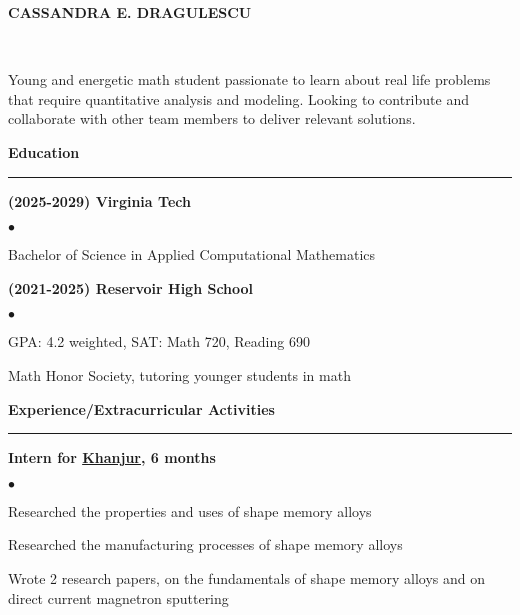 \documentclass[11pt]{article}
\begin{document}
\begin{center}
   \Large {\bf{CASSANDRA E. DRAGULESCU}}
\end{center}

\noindent
{}\\

\vspace*{8pt}
\noindent
Young and energetic math student passionate to learn about real life 
problems that require quantitative analysis and modeling.  Looking to
contribute and collaborate with other team members to deliver relevant 
solutions.

\vspace*{8pt}
\noindent
\large\textsf{\textbf {Education}}

\vspace*{-8pt}
\noindent
\rule{165mm}{0.25mm}
\normalfont\normalsize

\vspace*{4pt}
\noindent
{\bf (2025-2029) Virginia Tech} 
\begin{list}{$\bullet$}
   {\setlength{\itemsep}{0ex} \setlength{\parsep}{1ex}}

  \item Bachelor of Science in Applied Computational Mathematics
\end{list}


\noindent
{\bf (2021-2025) Reservoir High School} 
\begin{list}{$\bullet$}
   {\setlength{\itemsep}{0ex}
     \setlength{\parsep}{1ex}}
   
  \item GPA: 4.2 weighted, SAT: Math 720, Reading 690
  \item Math Honor Society, tutoring younger students in math
    
\end{list}


\noindent
\large\textsf{\textbf {Experience/Extracurricular Activities}}

\vspace*{-8pt}
\noindent
\rule{165mm}{0.25mm}
\normalfont\normalsize

\vspace*{4pt}
\noindent
{\bf Intern for \href{https://khanjur.com}{Khanjur}, 6 months} 
\begin{list}{$\bullet$}
   {\setlength{\itemsep}{0ex} \setlength{\parsep}{1ex}}

  \item Researched the properties and uses of shape memory alloys
  \item Researched the manufacturing processes of shape memory alloys
  \item Wrote 2 research papers, on the fundamentals of shape memory alloys 
    and on direct current magnetron sputtering
\end{list}
\end{document}
